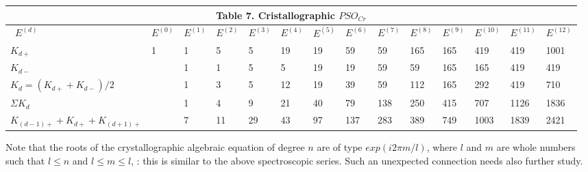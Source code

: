 \documentclass[a4paper,9pt]{article}
\begin{document}
\begin{table}
\label{tab:7:table7}
  \hskip-1.0cm\begin{tabular}{llllllllllllll}
    \toprule
    \multicolumn{14}{c}{Table 7. Cristallographic $PSO_{Cr}$}                  \\
    \cmidrule(r){1-14}
    \midrule
    
     
     
      
      \ $E^{(d)}$ & $E^{(0)}$ & $E^{(1)} $ & $E^{(2)}$ & $E^{(3)} $& $E^{(4)}$ &$ E^{(5)}$ &$ E^{(6)} $&$ E^{(7)}$ &$ E^{(8)}$ & $E^{(9)}$ &$ E^{(10)} $&$ E^{(11)} $&$ E^{(12)}$ \\
    \midrule
    $K_{d+}$  & 1 & 1 & 5 & 5 & 19 & 19 & 59 & 59 & 165 & 165 & 419 & 419 & 1001 \\
    
     $K_{d-}$  &  & 1 & 1 & 5 & 5 & 19 & 19 & 59 & 59 & 165 & 165& 419 & 419 \\
     
      $K_{d} = (K_{d+} + K_{d-})/2$  & & 1 & 3 & 5 & 12 & 19 & 39 & 59 & 112 & 165 & 292 & 419 & 710 \\
      
      $\Sigma K_{d}$ &  & 1 & 4 & 9 & 21 & 40 & 79 & 138 & 250 & 415 & 707 & 1126 & 1836 \\
      
      $K_{(d-1)+} +K_{d+}+ K_{(d+1)+}$  &  & 7 & 11 & 29 & 43 & 97 & 137 & 283 & 389 & 749 & 1003 & 1839 & 2421 \\

      

    \bottomrule
  \end{tabular}
  \label{tab:table}
\end{table}

Note that the roots of the crystallographic algebraic equation of degree $n$ are of type $exp(i2\pi m/l)$, where $l$ and $m$ are whole numbers such that $l \leq n$ and $l \leq m \leq l$,  : this is similar to the above spectroscopic series. Such an unexpected connection needs also further study.
\end{document}
